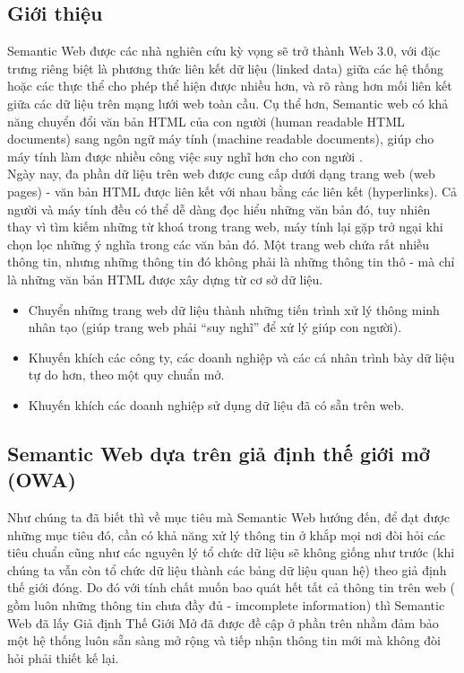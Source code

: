 \subsection{Giới thiệu}
Semantic Web được các nhà nghiên cứu kỳ vọng sẽ trở thành Web 3.0, với đặc trưng riêng biệt là phương thức liên kết dữ liệu (linked data) giữa các hệ thống hoặc các thực thể cho phép thể hiện được nhiều hơn, và rõ ràng hơn mối liên kết giữa các dữ liệu trên mạng lưới web toàn cầu. Cụ thể hơn, Semantic web có khả năng chuyển đổi văn bản HTML của con người (human readable HTML documents) sang ngôn ngữ máy tính (machine readable documents), giúp cho máy tính làm được nhiều công việc suy nghĩ hơn cho con người \cite{semantic1}.
\\
Ngày nay, đa phần dữ liệu trên web được cung cấp dưới dạng trang web (web pages) - văn bản HTML được liên kết với nhau bằng các liên kết (hyperlinks). Cả người và máy tính đều có thể dễ dàng đọc hiểu những văn bản đó, tuy nhiên thay vì tìm kiếm những từ khoá trong trang web, máy tính lại gặp trở ngại khi chọn lọc những ý nghĩa trong các văn bản đó. Một trang web chứa rất nhiều thông tin, nhưng những thông tin đó không phải là những thông tin thô - mà chỉ là những văn bản HTML được xây dựng từ cơ sở dữ liệu.
\begin{itemize}
\item Chuyển những trang web dữ liệu thành những tiến trình xử lý thông minh nhân tạo (giúp trang web phải “suy nghĩ” để xử lý giúp con người).
\item Khuyến khích các công ty, các doanh nghiệp và các cá nhân trình bày dữ liệu tự do hơn, theo một quy chuẩn mở.
\item Khuyến khích các doanh nghiệp sử dụng dữ liệu đã có sẵn trên web.
\end{itemize}

\subsection{Semantic Web dựa trên giả định thế giới mở (OWA)} 
Như chúng ta đã biết thì về mục tiêu mà Semantic Web hướng đến, để đạt được những mục tiêu đó, cần có khả năng xử lý thông tin ở khắp mọi nơi đòi hỏi các tiêu chuẩn cũng như các nguyên lý tổ chức dữ liệu sẽ không giống như trước (khi chúng ta vẫn còn tổ chức dữ liệu thành các bảng dữ liệu quan hệ) theo giả định thế giới đóng. Do đó với tính chất muốn bao quát hết tất cả thông tin trên web ( gồm luôn những thông tin chưa đầy đủ - imcomplete information) thì Semantic Web đã lấy Giả định Thế Giới Mở đã được đề cập ở phần trên nhằm đảm bảo một hệ thống luôn sẵn sàng mở rộng và tiếp nhận thông tin mới mà không đòi hỏi phải thiết kế lại.

